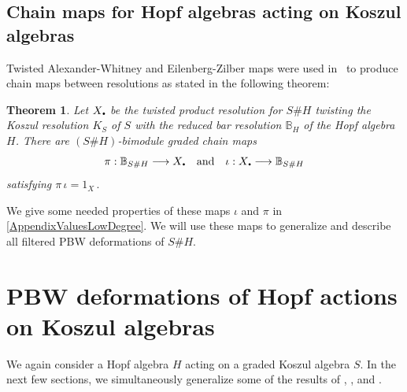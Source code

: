\documentclass[11pt]{amsart}
\numberwithin{equation}{section}
\newtheorem{thm}[equation]{Theorem}
\newcommand{\sd}{_{\DOT}}%
\newcommand{\BB}{\mathbb{B}} %
\newcommand{\DOT}{\setlength{\unitlength}{1.2pt}\begin{picture}(2.5,2)
               (1,1)\put(2.5,2.5){\circle*{2}}\end{picture}}
\renewcommand{\_}[1]{\mbox{$_{\left( #1 \right)}$}}
\newcommand{\ot}{\otimes}
\newcommand{\Ho}{H}%
\begin{document}
{\subsection*{Chain maps for Hopf algebras acting on Koszul algebras}
Twisted Alexander-Whitney and Eilenberg-Zilber maps
were used in~\cite{TTP-AWEZ} to produce chain maps between
resolutions as stated in the following theorem: 

 \begin{thm} \cite[Theorem 11.8]{TTP-AWEZ}\label{HopfKoszulConversion}
   Let $X\sd$
be the twisted product resolution for 
$S\# \Ho$ twisting the Koszul resolution $K_S$ of $S$
with the reduced bar resolution
$\BB_\Ho$ of the Hopf algebra $\Ho$.
There are $(S\# \Ho)$-bimodule graded chain maps
$$
\pi: \BB_{S\#\Ho}   \longrightarrow X\sd 
\quad\text{and}\quad 
\iota: X\sd \longrightarrow  \BB_{S\#\Ho}
$$
satisfying 
$
\pi \, \iota %
= 1_{X}\, . 
$
\end{thm}
%
We give some needed properties of these maps $\iota$ and $\pi$ in
\cref{AppendixValuesLowDegree}.
We will use these maps to
generalize 
\cite[Theorem 2.5]{SW-Koszul}
and describe all filtered PBW deformations of $S\# \Ho$.


\section{PBW deformations of Hopf actions on Koszul algebras}
\label{sec:ParametersToCochains}
We again consider a Hopf algebra $\Ho$ acting on a graded Koszul 
algebra $S$.
In the next few sections, we 
simultaneously generalize some of the results of 
\cite{Khare}, \cite{SW-Koszul}, and \cite{WW}.


}
\end{document}

